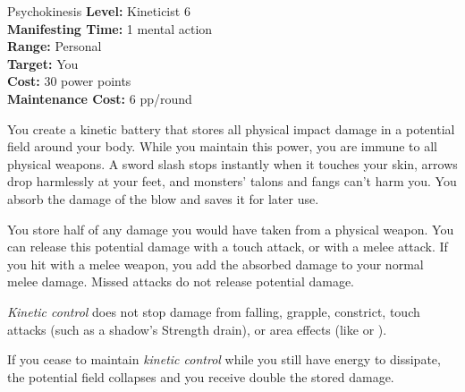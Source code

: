 {Psychokinesis}
{
	\textbf{Level:}
	Kineticist 6\\
	\textbf{Manifesting Time:}
	1 mental action\\
	\textbf{Range:}
	Personal\\
	\textbf{Target:}
	You\\
	\textbf{Cost:}
	30 power points\\
	\textbf{Maintenance Cost:}
	6 pp/round\\
}
{
	You create a kinetic battery that stores all physical impact damage in a potential field around your body. While you maintain this power, you are immune to all physical weapons. A sword slash stops instantly when it touches your skin, arrows drop harmlessly at your feet, and monsters' talons and fangs can't harm you. You absorb the damage of the blow and saves it for later use.

	You store half of any damage you would have taken from a physical weapon. You can release this potential damage with a touch attack, or with a melee attack. If you hit with a melee weapon, you add the absorbed damage to your normal melee damage. Missed attacks do not release potential damage.

	\emph{Kinetic control} does not stop damage from falling, grapple, constrict, touch attacks (such as a shadow's Strength drain), or area effects (like  or ).

	If you cease to maintain \emph{kinetic control} while you still have energy to dissipate, the potential field collapses and you receive double the stored damage.
}